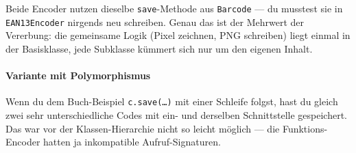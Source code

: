 Beide Encoder nutzen dieselbe \texttt{save}-Methode aus
\texttt{Barcode} — du musstest sie in \texttt{EAN13Encoder} nirgends
neu schreiben. Genau das ist der Mehrwert der Vererbung: die
gemeinsame Logik (Pixel zeichnen, PNG schreiben) liegt einmal in der
Basisklasse, jede Subklasse kümmert sich nur um den eigenen Inhalt.

\paragraph{Variante mit Polymorphismus} Wenn du dem Buch-Beispiel
\texttt{c.save(\dots)} mit einer Schleife folgst, hast du gleich
zwei sehr unterschiedliche Codes mit ein- und derselben Schnittstelle
gespeichert. Das war vor der Klassen-Hierarchie nicht so leicht möglich
— die Funktions-Encoder hatten ja inkompatible Aufruf-Signaturen.
